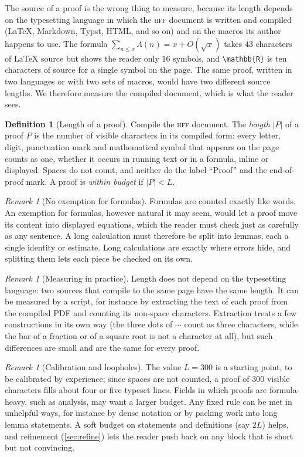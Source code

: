 \documentclass[11pt]{article}
\theoremstyle{plain}
\theoremstyle{definition}
\newtheorem{definition}[theorem]{Definition}
\theoremstyle{remark}
\newtheorem{remark}[theorem]{Remark}
\theoremstyle{definition}
\theoremstyle{plain}
\theoremstyle{remark}
\newcommand{\HFF}{\textsc{hff}}
\begin{document}
The source of a proof is the wrong thing to measure, because its length depends on the typesetting language in which the \HFF{} document is written and compiled (\LaTeX, Markdown, Typst, HTML, and so on) and on the macros its author happens to use. The formula $\sum_{n \le x} \Lambda(n) = x + O(\sqrt{x})$ takes $43$ characters of \LaTeX{} source but shows the reader only $16$ symbols, and \verb|\mathbb{R}| is ten characters of source for a single symbol on the page. The same proof, written in two languages or with two sets of macros, would have two different source lengths. We therefore measure the compiled document, which is what the reader sees.

\begin{definition}[Length of a proof]\label{def:length}
Compile the \HFF{} document. The \emph{length} $|P|$ of a proof $P$ is the number of visible characters in its compiled form: every letter, digit, punctuation mark and mathematical symbol that appears on the page counts as one, whether it occurs in running text or in a formula, inline or displayed. Spaces do not count, and neither do the label ``Proof'' and the end-of-proof mark. A proof is \emph{within budget} if $|P| < L$.
\end{definition}

\begin{remark}[No exemption for formulas]
Formulas are counted exactly like words. An exemption for formulas, however natural it may seem, would let a proof move its content into displayed equations, which the reader must check just as carefully as any sentence. A long calculation must therefore be split into lemmas, each a single identity or estimate. Long calculations are exactly where errors hide, and splitting them lets each piece be checked on its own.
\end{remark}

\begin{remark}[Measuring in practice]
Length does not depend on the typesetting language: two sources that compile to the same page have the same length. It can be measured by a script, for instance by extracting the text of each proof from the compiled PDF and counting its non-space characters. Extraction treats a few constructions in its own way (the three dots of $\cdots$ count as three characters, while the bar of a fraction or of a square root is not a character at all), but such differences are small and are the same for every proof.
\end{remark}

\begin{remark}[Calibration and loopholes]\label{rem:gaming}
The value $L = 300$ is a starting point, to be calibrated by experience; since spaces are not counted, a proof of $300$ visible characters fills about four or five typeset lines. Fields in which proofs are formula-heavy, such as analysis, may want a larger budget. Any fixed rule can be met in unhelpful ways, for instance by dense notation or by packing work into long lemma statements. A soft budget on statements and definitions (say $2L$) helps, and refinement (\cref{sec:refine}) lets the reader push back on any block that is short but not convincing.
\end{remark}
\end{document}
